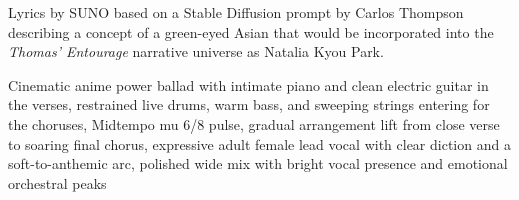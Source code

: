 
\begin{notes}
Lyrics by SUNO based on a Stable Diffusion prompt by Carlos Thompson describing a concept of a green-eyed Asian %
that would be incorporated into the \emph{Thomas’ Entourage} narrative universe as Natalia Kyou Park.
\end{notes}
\begin{style}
Cinematic anime power ballad with intimate piano and clean electric guitar in the verses, restrained live drums, warm bass, and sweeping strings entering for the choruses, Midtempo  mu 6/8 pulse, gradual arrangement lift from close verse to soaring final chorus, expressive adult female lead vocal with clear diction and a soft-to-anthemic arc, polished wide mix with bright vocal presence and emotional orchestral peaks
\end{style}
